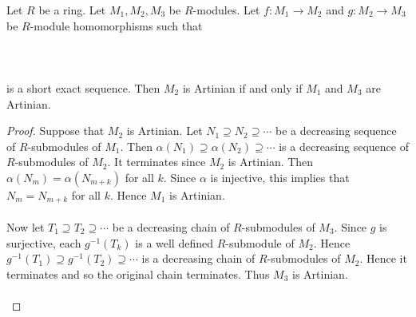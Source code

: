 \documentclass[a4paper]{article}
\begin{document}
\begin{prp}{}{} Let $R$ be a ring. Let $M_1,M_2,M_3$ be $R$-modules. Let $f:M_1\to M_2$ and $g:M_2\to M_3$ be $R$-module homomorphisms such that \\~\\
\\~\\
is a short exact sequence. Then $M_2$ is Artinian if and only if $M_1$ and $M_3$ are Artinian. 
\begin{proof}
Suppose that $M_2$ is Artinian. Let $N_1\supseteq N_2\supseteq\cdots$ be a decreasing sequence of $R$-submodules of $M_1$. Then $\alpha(N_1)\supseteq\alpha(N_2)\supseteq\cdots$ is a decreasing sequence of $R$-submodules of $M_2$. It terminates since $M_2$ is Artinian. Then $\alpha(N_m)=\alpha(N_{m+k})$ for all $k$. Since $\alpha$ is injective, this implies that $N_m=N_{m+k}$ for all $k$. Hence $M_1$ is Artinian. \\~\\

Now let $T_1\supseteq T_2\supseteq\cdots$ be a decreasing chain of $R$-submodules of $M_3$. Since $g$ is surjective, each $g^{-1}(T_k)$ is a well defined $R$-submodule of $M_2$. Hence $g^{-1}(T_1)\supseteq g^{-1}(T_2)\supseteq\cdots$ is a decreasing chain of $R$-submodules of $M_2$. Hence it terminates and so the original chain terminates. Thus $M_3$ is Artinian. \\~\\


\end{proof}
\end{prp}
\end{document}
